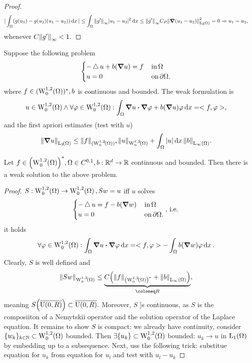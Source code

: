 \documentclass{article}
\begin{document}
\begin{example}
\begin{proof}
		\[
			|\int_{\Omega}(g(u_1)-g(u_2)(u_1-u_2))\dd{x}| \leq \int_{\Omega}\norm{g'}_{\infty}|u_1 - u_2|^{2}\dd{x} \leq \norm{g'}_{\infty}C_P \norm{\grad(u_1 - u_2)}_{\LpSet[2]{\Omega}}^{2} = 0 \Rightarrow u_1 = u_2,
		\]
		whenever $C \norm{g'}_{\infty} <1.$
	\end{proof}
\end{example}

\begin{example}
	Suppose the following problem
	\[
		\begin{cases}
			- \operatorname{\bigtriangleup} u + b\qty(\grad u) = f & \, \text{in} \, \Omega \\
			u = 0 & \, \text{on} \, \partial \Omega.
		\end{cases}
	\]
	where $f \in (\WkpzeroSet[1][2]{\Omega})^{*}, b$ is continuous and bounded. The weak formulation is
	\[
		u \in \WkpzeroSet[1][2]{\Omega} \wedge \forall \varphi \in \WkpzeroSet[1][2]{\Omega}: \int_{\Omega}\grad u \vdot \grad \varphi + b\qty(\grad u) \varphi\dd{x} = <f,\varphi>,
	\]
	and the first apriori estimates (test with $u$)
	\[
		\norm{\grad u}_{\LpSet[2]{\Omega}} \leq \norm{f}_{(\WkpzeroSet[1][2]{\Omega})^{*}} \norm{u}_{\WkpzeroSet[1][2]{\Omega}}+ \int_{\Omega}|u|\dd{x} \norm{b}_{\LinfSet{\Omega}}.
	\]
	\begin{theorem}
		Let $f \in \qty(\WkpzeroSet[1][2]{\Omega})^{*}, \Omega \in C^{0,1}, b: \R^d \to \R$ continuous and bounded. Then there is a weak solution to the above problem.
	\end{theorem}
	\begin{proof}
		$S: \WkpzeroSet[1][2]{\Omega} \to \WkpzeroSet[1][2]{\Omega}, Sw = u$ iff $u$ solves
		\[
			\begin{cases}
				- \operatorname{\bigtriangleup} u = f - b\qty(\grad w) & \, \text{in} \, \Omega \\
				u = 0 & \, \text{on} \, \partial \Omega.
			\end{cases}, \, \text{i.e.} \,
		\]
		it holds
		\[
			\forall \varphi \in \WkpzeroSet[1][2]{\Omega}: \int_{\Omega}\grad u \vdot \grad \varphi\dd{x} = <f, \varphi> - \int_{\Omega}b\qty(\grad w) \varphi\dd{x}.
		\]
		Clearly, $S$ is well defined and
		\[
			\norm{Sw}_{\WkpzeroSet[1][2]{\Omega}} \leq \underbrace{C\qty(\norm{f}_{\qty(\WkpzeroSet[1][2]{\Omega})^{*}}+ \norm{b}_{\LinfSet{\Omega}})}_{\coloneq R},
		\]
		meaning $S\qty(\overline{\text{U}(0,R)}) \subset \overline{\text{U}(0,R)}.$
		Moreover, $S$ ]s continuous, as $S$ is the composiiton of a Nemytskii operator and the solution operator of the Laplace equation. It remains to show $S$ is compact: we already have continuity, consider $\{w_k\}_{k \in \N} \subset \WkpzeroSet[1][2]{\Omega}$ bounded. Then $\exists \{u_k\} \subset \WkpzeroSet[1][2]{\Omega}$ bounded: $u_k \to u$ in $\LpSet[1]{\Omega}$ by embedding up to a subsequence. Next, uss the following trick: substitue equation for $u_k$ from equation for $u_l$ and test with $u_l - u_k$

\end{proof}
\end{example}
\end{document}
